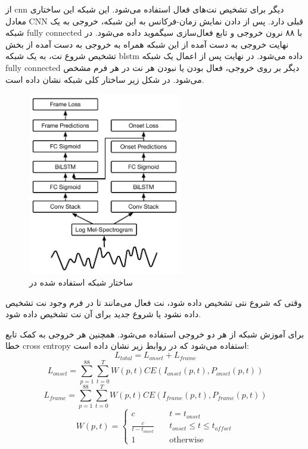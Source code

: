 از \gls{cnn} دیگر برای تشخیص نت‌های فعال استفاده می‌شود. این شبکه این ساختاری
معادل \gls{CNN} قبلی دارد. پس از دادن نمایش زمان-فرکانس به این شبکه، خروجی به یک
شبکه \gls{fully connected} با ۸۸ نرون خروجی و تابع فعال‌سازی سیگموید داده
می‌شود. در نهایت خروجی به دست آمده از این شبکه همراه به خروجی به دست آمده از بخش
تشخیص شروع نت، به یک شبکه \gls{blstm} داده می‌شود. در نهایت پس از اعمال یک شبکه
\gls{fully connected} دیگر بر روی خروجی، فعال بودن یا نبودن هر نت در هر فرم مشخص
می‌شود. در شکل زیر ساختار کلی شبکه نشان داده است.
\begin{figure}[ht]
    \centering
    \includegraphics[height=8cm]{./statics/onset_onframe_architecture.png}
    \caption{ساختار شبکه استفاده شده در \cite{hawthorne2017onsets}}
\end{figure}

وقتی که شروع نتی تشخیص داده شود، نت فعال می‌مانند تا در فرم وجود نت تشخیص داده
نشود یا شروع جدید برای آن نت تشخیص داده شود.

برای آموزش شبکه از هر دو خروجی استفاده می‌شود. همچنین هر خروجی به کمک تابع خطا
\gls{cross entropy} استفاده می‌شود که در روابط زیر نشان داده است:
\begin{equation}
    L_{total} = L_{onset} + L_{frame}
\end{equation}
\begin{equation}
    L_{onset} = \sum_{p=1}^{88} \sum_{t=0}^{T} W(p, t) CE(I_{onset}(p, t), P_{onset}(p, t))
\end{equation}
\begin{equation}
    L_{frame} = \sum_{p=1}^{88} \sum_{t=0}^{T} W(p, t) CE(I_{frame}(p, t), P_{frame}(p, t))
\end{equation}
\begin{equation}
    W(p, t) =
    \begin{cases}
        c &\quad t = t_{onset}\\
        \frac{c}{t - t_{onset}} &\quad t_{onset} \leq t \leq t_{offset}\\
        1 &\quad \text{otherwise}
    \end{cases}
\end{equation}

